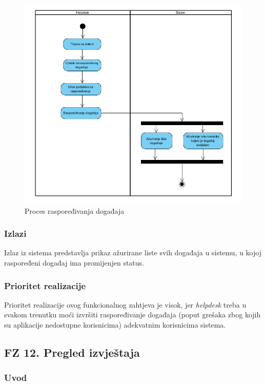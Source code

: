 \documentclass[12pt,a4paper]{article}
\begin{document}
\begin{figure}[H]
\center
\includegraphics[scale=0.5]{../res/Activity/activity11.JPG}
\caption{Proces raspoređivanja događaja}
\label{act11}
\end{figure}

\subsubsection{Izlazi}

Izlaz iz sistema predstavlja prikaz ažurirane liste svih događaja u sistemu, u kojoj raspoređeni događaj ima promijenjen status.

\subsubsection{Prioritet realizacije}

Prioritet realizacije ovog funkcionalnog zahtjeva je visok, jer \textit{helpdesk} treba u svakom trenutku moći izvršiti raspoređivanje događaja (poput grešaka zbog kojih su aplikacije nedostupne korisnicima) adekvatnim korisnicima sistema.

\subsection{FZ 12. Pregled izvještaja}

\subsubsection{Uvod}
\end{document}

